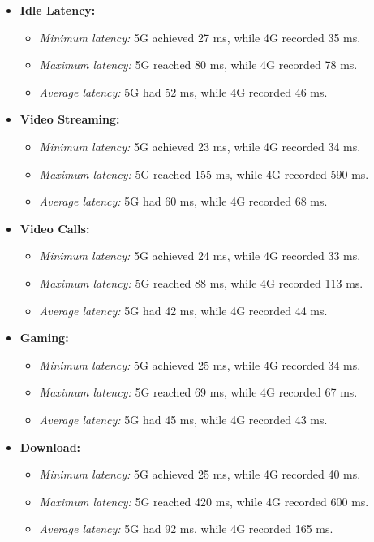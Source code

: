\documentclass[conference]{IEEEtran}
\begin{document}
\begin{itemize}
    \item \textbf{Idle Latency:}
    \begin{itemize}
        \item \textit{Minimum latency:} 5G achieved 27 ms, while 4G recorded 35 ms.
        \item \textit{Maximum latency:} 5G reached 80 ms, while 4G recorded 78 ms.
        \item \textit{Average latency:} 5G had 52 ms, while 4G recorded 46 ms.
    \end{itemize}
    
    \item \textbf{Video Streaming:}
    \begin{itemize}
        \item \textit{Minimum latency:} 5G achieved 23 ms, while 4G recorded 34 ms.
        \item \textit{Maximum latency:} 5G reached 155 ms, while 4G recorded 590 ms.
        \item \textit{Average latency:} 5G had 60 ms, while 4G recorded 68 ms.
    \end{itemize}
    
    \item \textbf{Video Calls:}
    \begin{itemize}
        \item \textit{Minimum latency:} 5G achieved 24 ms, while 4G recorded 33 ms.
        \item \textit{Maximum latency:} 5G reached 88 ms, while 4G recorded 113 ms.
        \item \textit{Average latency:} 5G had 42 ms, while 4G recorded 44 ms.
    \end{itemize}
    
    \item \textbf{Gaming:}
    \begin{itemize}
        \item \textit{Minimum latency:} 5G achieved 25 ms, while 4G recorded 34 ms.
        \item \textit{Maximum latency:} 5G reached 69 ms, while 4G recorded 67 ms.
        \item \textit{Average latency:} 5G had 45 ms, while 4G recorded 43 ms.
    \end{itemize}
    
    \item \textbf{Download:}
    \begin{itemize}
        \item \textit{Minimum latency:} 5G achieved 25 ms, while 4G recorded 40 ms.
        \item \textit{Maximum latency:} 5G reached 420 ms, while 4G recorded 600 ms.
        \item \textit{Average latency:} 5G had 92 ms, while 4G recorded 165 ms.
    \end{itemize}
\end{itemize}
\end{document}
